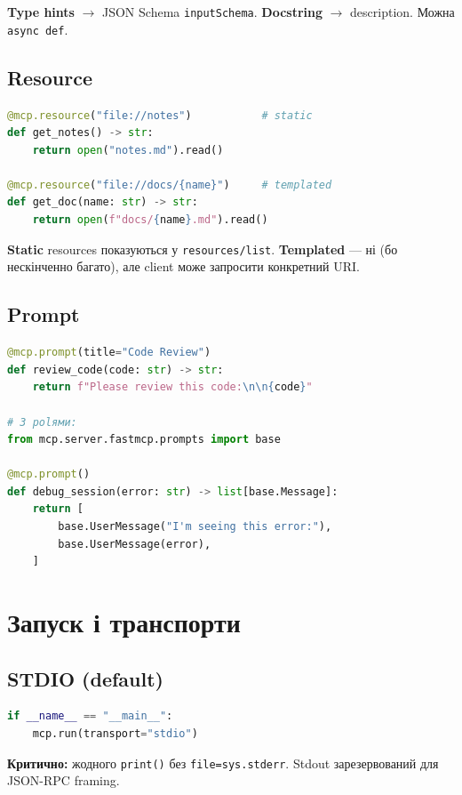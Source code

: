 \documentclass[11pt,a4paper]{article}
\begin{document}
\textbf{Type hints} $\to$ JSON Schema \texttt{inputSchema}. \textbf{Docstring} $\to$ description. Можна \texttt{async def}.

\subsection{Resource}

\begin{lstlisting}[language=python]
@mcp.resource("file://notes")           # static
def get_notes() -> str:
    return open("notes.md").read()

@mcp.resource("file://docs/{name}")     # templated
def get_doc(name: str) -> str:
    return open(f"docs/{name}.md").read()
\end{lstlisting}

\textbf{Static} resources показуються у \texttt{resources/list}. \textbf{Templated} --- ні (бо нескінченно багато), але client може запросити конкретний URI.

\subsection{Prompt}

\begin{lstlisting}[language=python]
@mcp.prompt(title="Code Review")
def review_code(code: str) -> str:
    return f"Please review this code:\n\n{code}"

# З роlями:
from mcp.server.fastmcp.prompts import base

@mcp.prompt()
def debug_session(error: str) -> list[base.Message]:
    return [
        base.UserMessage("I'm seeing this error:"),
        base.UserMessage(error),
    ]
\end{lstlisting}

\section{Запуск і транспорти}

\subsection{STDIO (default)}

\begin{lstlisting}[language=python]
if __name__ == "__main__":
    mcp.run(transport="stdio")
\end{lstlisting}

\textbf{Критично:} жодного \texttt{print()} без \texttt{file=sys.stderr}. Stdout зарезервований для JSON-RPC framing.
\end{document}
